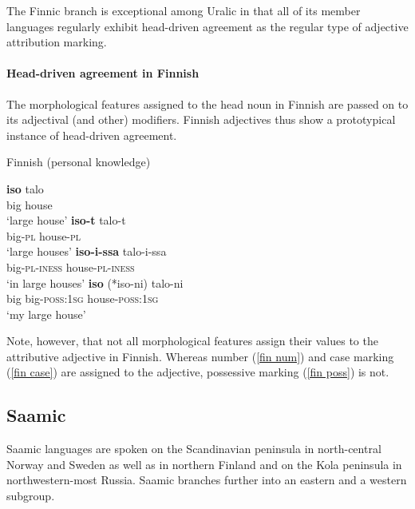 The Finnic branch is exceptional among Uralic in that all of its member languages regularly exhibit head\hyp{}driven agreement as the regular type of adjective attribution marking.

\paragraph*{Head\hyp{}driven agreement in Finnish}
\label{finnish synchr}
The morphological features assigned to the head noun in Finnish are passed on to its adjectival (and other) modifiers. Finnish adjectives thus show a prototypical instance of head\hyp{}driven agreement. 
\begin{exe}
\ex \rm{Finnish (personal knowledge)}
\begin{xlist}
\ex
\gll	\textbf{iso} talo\\
	big house\\
\glt	‘large house’
\label{fin num}
\ex \gll	\textbf{iso-t} talo-t\\
	big-\textsc{pl} house-\textsc{pl}\\
\glt	‘large houses’
\ex \label{fin case}
\gll	\textbf{iso-i-ssa}	talo-i-ssa\\
	big-\textsc{pl}-\textsc{iness} house-\textsc{pl}-\textsc{iness}\\
\glt	‘in large houses’
\label{fin poss}
\ex 	
\gll	\textbf{iso} {(*iso-ni)} talo-ni\\
	big big-\textsc{poss:1sg} house-\textsc{poss:1sg}\\
\glt	‘my large house’
\end{xlist}
\end{exe}
Note, however, that not all morphological features assign their values to the attributive adjective in Finnish. Whereas number (\ref{fin num}) and case marking (\ref{fin case}) are assigned to the adjective, possessive marking (\ref{fin poss}) is not.

\subsection{Saamic}\label{saami synchr}
Saamic languages are spoken on the Scandinavian peninsula in north-central Norway and Sweden as well as in northern Finland and on the Kola peninsula in northwestern-most Russia. Saamic branches further into an eastern and a western subgroup.

